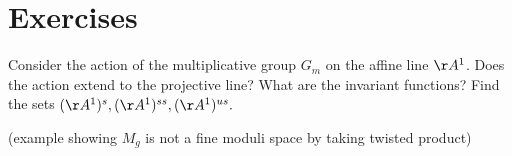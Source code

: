\section{Exercises}

\begin{exercise}
Consider the action of the multiplicative group $G_m$ on the affine line $\AA^1$. Does the action extend
to the projective line? What are the invariant functions? Find the sets $(\AA^1)^s, (\AA^1)^{ss}, (\AA^1)^{us}.$
\end{exercise}

\begin{exercise}
(example showing $M_g$ is not a fine moduli space by taking twisted product)
\end{exercise}


